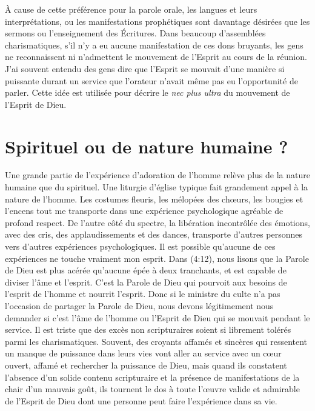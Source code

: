 À cause de cette préférence pour la parole orale, les langues
 et leurs interprétations, ou les manifestations prophétiques
 sont davantage désirées que les sermons ou l'enseignement des Écritures.
 Dans beaucoup d'assemblées charismatiques, s'il n'y a eu aucune
 manifestation de ces dons bruyants, les gens ne reconnaissent ni
 n'admettent le mouvement de l'Esprit au cours de la réunion.
 J'ai souvent entendu des gens dire que l'Esprit se mouvait d'une manière
 si puissante durant un service que l'orateur n'avait même pas eu
 l'opportunité de parler. Cette idée est utilisée pour décrire le
 \emph{nec plus ultra} du mouvement de l'Esprit de Dieu.


\section{Spirituel ou de nature humaine ?}

Une grande partie de l'expérience d'adoration de l'homme relève plus
 de la nature humaine que du spirituel.
 Une liturgie d'église typique fait grandement appel à la nature de l'homme.
 Les costumes fleuris, les mélopées des chœurs, les bougies et l'encens
 \ocadr tout me transporte dans une expérience psychologique agréable
 de profond respect. De l'autre côté du spectre, la libération incontrôlée
 des émotions, avec des cris, des applaudissements et des dances,
 transporte d'autres personnes vers d'autres expériences psychologiques.
 Il est possible qu'aucune de ces expériences ne touche vraiment mon esprit.
 Dans (4:12), nous lisons que la Parole de Dieu
 est plus acérée qu'aucune épée à deux tranchants,
 et est capable de diviser l'âme et l'esprit.
 C'est la Parole de Dieu qui pourvoit aux besoins de l'esprit de l'homme
 et nourrit l'esprit. Donc si le ministre du culte n'a pas l'occasion
 de partager la Parole de Dieu, nous devons légitimement nous demander
 si c'est l'âme de l'homme ou l'Esprit de Dieu qui se mouvait pendant
 le service. Il est triste que des excès non scripturaires soient si
 librement tolérés parmi les charismatiques.
 Souvent, des croyants affamés et sincères qui ressentent un manque
 de puissance dans leurs vies vont aller au service avec un cœur ouvert,
 affamé et rechercher la puissance de Dieu, mais quand ils constatent
 l'absence d'un solide contenu scripturaire et la présence
 de manifestations de la chair d'un mauvais goût, ils tournent le dos
 à toute l'œuvre valide et admirable de l'Esprit de Dieu dont une personne
 peut faire l'expérience dans sa vie.



